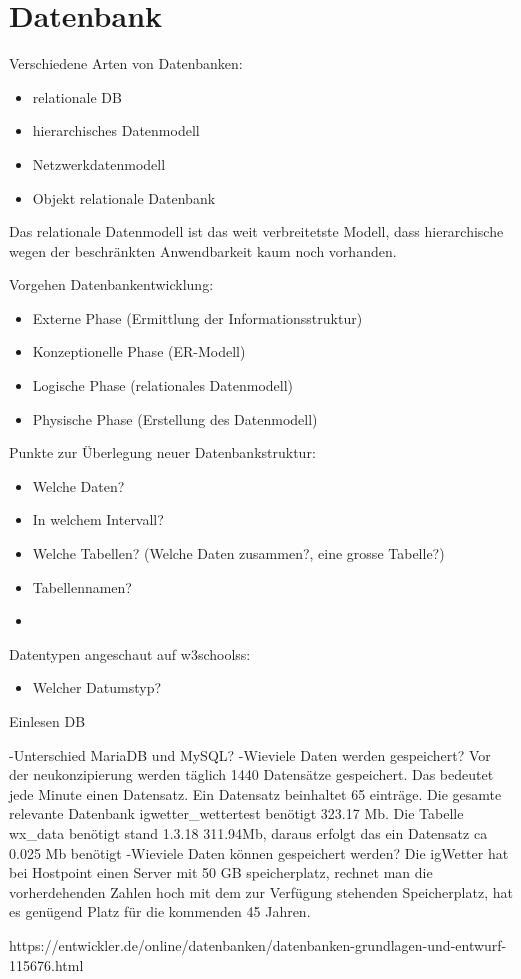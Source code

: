 \section{Datenbank}

Verschiedene Arten von Datenbanken:
\begin{itemize}
\item relationale DB
\item hierarchisches Datenmodell
\item Netzwerkdatenmodell
\item Objekt relationale Datenbank
\end{itemize}

Das relationale Datenmodell ist das weit verbreitetste Modell, dass hierarchische wegen der beschränkten Anwendbarkeit kaum noch vorhanden.

Vorgehen Datenbankentwicklung:

\begin{itemize}
\item Externe Phase (Ermittlung der Informationsstruktur)
\item Konzeptionelle Phase (ER-Modell)
\item Logische Phase (relationales Datenmodell)
\item Physische Phase (Erstellung des Datenmodell)
\end{itemize}

Punkte zur Überlegung neuer Datenbankstruktur:
\begin{itemize}
\item Welche Daten?
\item In welchem Intervall?
\item Welche Tabellen? (Welche Daten zusammen?, eine grosse Tabelle?)
\item Tabellennamen?
\item 
\end{itemize}

Datentypen angeschaut auf w3schoolss:
\begin{itemize}
\item Welcher Datumstyp?

\end{itemize}

Einlesen DB


-Unterschied MariaDB und MySQL?
-Wieviele Daten werden gespeichert?
Vor der neukonzipierung werden täglich 1440 Datensätze gespeichert. Das bedeutet jede Minute einen Datensatz. Ein Datensatz beinhaltet 65 einträge. Die gesamte relevante Datenbank igwetter_wettertest benötigt 323.17  Mb. Die Tabelle wx_data benötigt stand 1.3.18 311.94Mb, daraus erfolgt das ein Datensatz ca 0.025 Mb benötigt 
-Wieviele Daten können gespeichert werden?
Die igWetter hat bei Hostpoint einen Server mit 50 GB speicherplatz, rechnet man die vorherdehenden Zahlen hoch mit dem zur Verfügung stehenden Speicherplatz, hat es genügend Platz für die kommenden 45 Jahren. 

https://entwickler.de/online/datenbanken/datenbanken-grundlagen-und-entwurf-115676.html
